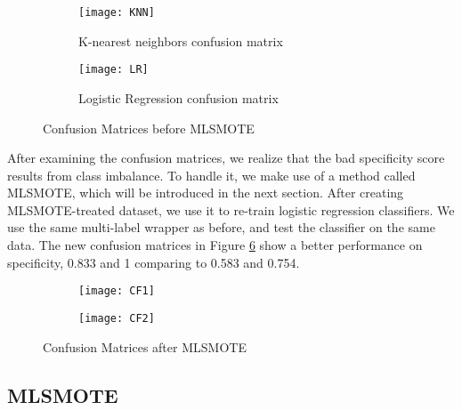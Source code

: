 \documentclass[11.5pt]{article}
\begin{document}
\begin{figure}[htb]
\begin{subfigure}[b]{0.5\textwidth}
  \texttt{[image: KNN]}
  \caption{K-nearest neighbors confusion matrix}
  \label{fig:knn}
  \end{subfigure}
  \begin{subfigure}[b]{0.5\textwidth}
  \texttt{[image: LR]}
   \caption{Logistic Regression confusion matrix}
  \label{fig:lr}
  \end{subfigure}
\caption{Confusion Matrices before MLSMOTE}
\end{figure}

After examining the confusion matrices, we realize that the bad specificity score results from class imbalance. To handle it, we make use of a method called MLSMOTE, which will be introduced in the next section. After creating MLSMOTE-treated dataset, we use it to re-train logistic regression classifiers. We use the same multi-label wrapper as before, and test the classifier on the same data. The new confusion matrices in Figure \ref{fig:cf} show a better performance on specificity, 0.833 and 1 comparing to 0.583 and 0.754. 

\begin{figure}[htb]
\begin{subfigure}[b]{0.5\textwidth}
  \texttt{[image: CF1]}
  \label{fig:cf1}
  \end{subfigure}
  \begin{subfigure}[b]{0.5\textwidth}
  \texttt{[image: CF2]}
  \label{fig:cf2}
  \end{subfigure}
\caption{Confusion Matrices after MLSMOTE}\label{fig:cf}
\end{figure}




\subsection{MLSMOTE}
\end{document}
